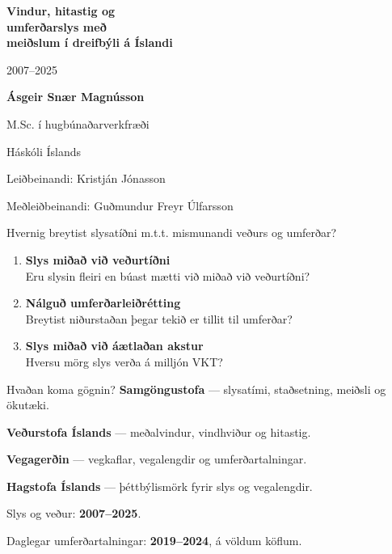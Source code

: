 \documentclass[aspectratio=169,12pt,t]{beamer}
\begin{document}
\begin{frame}[plain]
\relax
\vspace{3mm}
{\fontsize{23}{28}\selectfont\bfseries Vindur, hitastig og\\umferðarslys með\\meiðslum í dreifbýli á Íslandi\par}
\vspace{4mm}
2007--2025\par
\vspace{5mm}
\textbf{Ásgeir Snær Magnússon}\par
M.Sc. í hugbúnaðarverkfræði\par
Háskóli Íslands\par
\vspace{4mm}
{\small Leiðbeinandi: Kristján Jónasson\par
Meðleiðbeinandi: Guðmundur Freyr Úlfarsson\par}
\end{frame}

\begin{frame}{Hvernig breytist slysatíðni m.t.t. mismunandi veðurs og umferðar?}
\relax
\begin{enumerate}\points
\item \textbf{Slys miðað við veðurtíðni}\\Eru slysin fleiri en búast mætti við miðað við veðurtíðni?
\item \textbf{Nálguð umferðarleiðrétting}\\Breytist niðurstaðan þegar tekið er tillit til umferðar?
\item \textbf{Slys miðað við áætlaðan akstur}\\Hversu mörg slys verða á milljón VKT?
\end{enumerate}
\end{frame}

\begin{frame}{Hvaðan koma gögnin?}
\relax
\textbf{Samgöngustofa} — slysatími, staðsetning, meiðsli og ökutæki.\par
\textbf{Veðurstofa Íslands} — meðalvindur, vindhviður og hitastig.\par
\textbf{Vegagerðin} — vegkaflar, vegalengdir og umferðartalningar.\par
\textbf{Hagstofa Íslands} — þéttbýlismörk fyrir slys og vegalengdir.\par
\vspace{5mm}
Slys og veður: \textbf{2007--2025}.\par
Daglegar umferðartalningar: \textbf{2019--2024}, á völdum köflum.
\end{frame}
\end{document}
